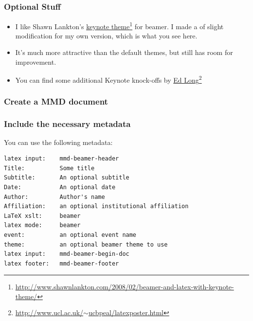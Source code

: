 \begin{frame}

\frametitle{Optional Stuff}
\label{optionalstuff}

\begin{itemize}
\item I like Shawn Lankton's \href{http://www.shawnlankton.com/2008/02/beamer-and-latex-with-keynote-theme/}{keynote theme}\footnote{\href{http://www.shawnlankton.com/2008/02/beamer-and-latex-with-keynote-theme/}{http:/\slash www.shawnlankton.com\slash 2008\slash 02\slash beamer-and-latex-with-keynote-theme\slash }}
 for beamer. I made a of slight modification for my own version, which is
 what you see here.

\item It's much more attractive than the default themes, but still has room for
 improvement.

\item You can find some additional Keynote knock-offs by \href{http://www.ucl.ac.uk/~ucbpeal/latexposter.html}{Ed Long}\footnote{\href{http://www.ucl.ac.uk/~ucbpeal/latexposter.html}{http:/\slash www.ucl.ac.uk\slash \ensuremath{\sim}ucbpeal\slash latexposter.html}}

\end{itemize}

\end{frame}

\begin{frame}

\frametitle{Create a MMD document}
\label{createammddocument}


\end{frame}

\begin{frame}[fragile]

\frametitle{Include the necessary metadata}
\label{includethenecessarymetadata}

You can use the following metadata:

\begin{verbatim}
latex input:    mmd-beamer-header
Title:          Some title
Subtitle:       An optional subtitle
Date:           An optional date
Author:         Author's name
Affiliation:    an optional institutional affiliation
LaTeX xslt:     beamer
latex mode:     beamer  
event:          an optional event name
theme:          an optional beamer theme to use
latex input:    mmd-beamer-begin-doc
latex footer:   mmd-beamer-footer
\end{verbatim}


\end{frame}


